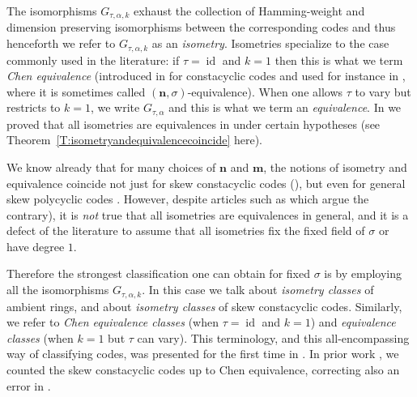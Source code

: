 \documentclass[11pt]{amsart}
\theoremstyle{plain}
\theoremstyle{definition}
\numberwithin{equation}{section}
\numberwithin{figure}{section}
\DeclareMathOperator{\id}{id}
\newcommand{\os}{{\mathbf{m}}}  %
\newcommand{\de}{{\mathbf{n}}}  %
\begin{document}
 The isomorphisms $G_{\tau,\alpha,k}$ exhaust the collection of Hamming-weight and dimension preserving isomorphisms between the corresponding codes and thus henceforth we refer to $G_{\tau,\alpha,k}$ as an \emph{isometry}.  Isometries specialize to the case commonly used in the literature: if $\tau=\id$ and $k=1$ then this is what we term \emph{Chen equivalence} (introduced in \cite{Chen2012} for constacyclic codes and used for instance in \cite{LobilloMunoz2025, OuazzouHorlemannAydin2025, OuazzouNajmeddineAydin2025}, where it is sometimes called $(\de,\sigma)$-equivalence).  When one allows $\tau$ to vary but restricts to $k=1$,  we write  $G_{\tau,\alpha}$ and this is what we term an \emph{equivalence}.   In \cite{NevinsPumpluen2025submitted} we proved that all isometries are equivalences in under certain hypotheses (see  Theorem~\ref{T:isometryandequivalencecoincide} here).


 We know already that for many choices of $\de$ and $\os$, the notions of isometry and equivalence coincide not just  for skew constacyclic codes  (\cite[Corollary 4.5]{NevinsPumpluen2025submitted}), but even for general skew polycyclic codes \cite{Pumpluen2025}.
 However, despite articles such as \cite{Bajalanetal2026} which argue the contrary), it is \emph{not} true that all isometries are equivalences in general, and it is a defect of the literature to assume that all isometries fix the fixed field of $\sigma$ or have degree $1$.


Therefore the strongest classification one can obtain for fixed $\sigma$ is by employing all the isomorphisms $G_{\tau,\alpha,k}$. In this case we talk about \emph{isometry classes} of ambient rings, and about \emph{isometry classes} of skew constacyclic codes.  Similarly, we refer to \emph{Chen equivalence classes} (when $\tau=\id$ and $k=1$) and \emph{equivalence classes} (when $k=1$ but $\tau$ can vary).  This  terminology, and this all-encompassing way of classifying codes, was presented for the first time in \cite{Pumpluen2025}. In prior work \cite{NevinsPumpluen2025submitted}, we counted the skew constacyclic codes  up to Chen equivalence, correcting also an error in \cite{OuazzouNajmeddineAydin2025}.  %
\end{document}
